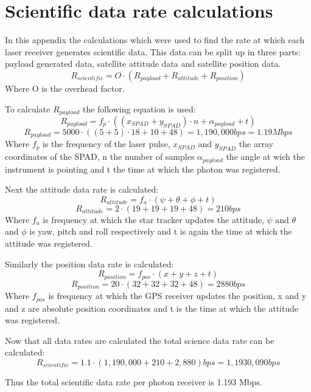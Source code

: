 \chapter{Scientific data rate calculations}
\label{scirate}
In this appendix the calculations which were used to find the rate at which each laser receiver generates scientific data.
This data can be split up in three parts: payload generated data, satellite attitude data and satellite position data.
\begin{equation}
R_{scientific}=O\cdot (R_{payload}+ R_{attitude} + R_{position})
\end{equation}
Where O is the overhead factor.

To calculate $R_{payload}$ the following equation is used:
\begin{equation}
R_{payload}=f_{p} \cdot ((x_{SPAD}+y_{SPAD})\cdot n+ \alpha_{payload}+t)
\end{equation}
\begin{equation}
R_{payload}=5000 \cdot ((5+5)\cdot 18+10+48)=1,190,000 bps=1.19 Mbps 
\end{equation}
Where $f_{p}$ is the frequency of the laser pulse, $x_{SPAD}$ and $y_{SPAD}$ the array coordinates of the SPAD, n the number of samples $\alpha_{payload}$ the angle at wich the instrument is pointing and t the time at which the photon was registered.

Next the attitude data rate is calculated:
\begin{equation}
R_{attitude}=f_{a} \cdot (\psi + \theta + \phi +t)
\end{equation}
\begin{equation}
R_{attitude}=2 \cdot (19+19+19+48)=210 bps 
\end{equation}
Where $f_{a}$ is frequency at which the star tracker updates the attitude, $\psi$ and $\theta$ and $\phi$ is yaw, pitch and roll respectively and t is again the time at which the attitude was registered.

Similarly the position data rate is calculated:
\begin{equation}
R_{position}=f_{pos} \cdot (x + y + z +t)
\end{equation}
\begin{equation}
R_{position}=20 \cdot (32+32+32+48)=2880 bps 
\end{equation}
Where $f_{pos}$ is frequency at which the GPS receiver updates the position, x and y and z are absolute position coordinates and t is the time at which the attitude was registered.

Now that all data rates are calculated the total science data rate can be calculated:
\begin{equation}
R_{scientific}=1.1\cdot (1,190,000 + 210 + 2,880) bps= 1,1930,090 bps
\end{equation}

Thus the total scientific data rate per photon receiver is 1.193 Mbps.